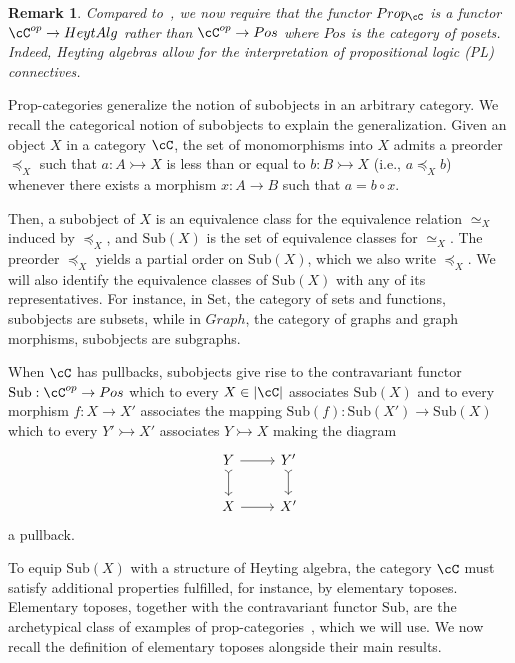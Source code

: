 \documentclass[preprint,3p,times]{elsarticle}
\newtheorem{remark}[definition]{Remark}
\newcommand{\Set}{\mathrm{Set}}
\newcommand{\Sub}{\mathrm{Sub}}
\newcommand{\Heytalg}{HeytAlg}
\newcommand{\mto}{\rightarrowtail}
\begin{document}
\begin{remark}
    Compared to~\cite{AB23}, we now require that the functor \(Prop_\cC\) is a functor \(\cC^{op} \to \Heytalg\) rather than \(\cC^{op} \to Pos\) where \(Pos\) is the category of posets. Indeed, Heyting algebras allow for the interpretation of propositional logic (PL) connectives. %
\end{remark}
 
Prop-categories generalize the notion of subobjects in an arbitrary category. We recall the categorical notion of subobjects to explain the generalization. 
Given an object \(X\) in a category \(\cC\), the set of monomorphisms into \(X\) admits a preorder \(\preceq_X\) such that \(a: A \mto X\) is less than or equal to \(b: B \mto X\) (i.e., $a \preceq_X b$) whenever there exists a morphism \(x: A \to B\) such that \(a = b \circ x\).

Then, a subobject of \(X\) is an equivalence class for the equivalence relation \(\simeq_X\) induced by \(\preceq_X\), and $\Sub(X)$ is the set of equivalence classes for $\simeq_X$. The preorder \(\preceq_X\) yields a partial order on \(\Sub(X)\), which we also write \(\preceq_X\). We will also identify the equivalence classes of \(\Sub(X)\) with any of its representatives. For instance, in \(\Set\), the category of sets and functions, subobjects are subsets, while in \(Graph\), the category of graphs and graph morphisms, subobjects are subgraphs.

When \(\cC\) has pullbacks, subobjects give rise to the contravariant functor $\Sub : \cC^{op} \to Pos$ which to every $X \in |\cC|$ associates $\Sub(X)$ and to every morphism $f : X \to X'$ associates the mapping $\Sub(f) : \Sub(X') \to \Sub(X)$ which to every $Y' \mto X'$ associates $Y \mto X$ making the diagram
\[\begin{tikzcd}
	Y & {Y'} \\
	X & {X'}
	\arrow[from=1-1, to=1-2]
	\arrow[tail, from=1-2, to=2-2]
	\arrow[tail, from=1-1, to=2-1]
	\arrow[from=2-1, to=2-2]
\end{tikzcd}\]
a pullback.

To equip $\Sub(X)$ with a structure of Heyting algebra, the category $\cC$ must satisfy additional properties fulfilled, for instance, by elementary toposes. Elementary toposes, together with the contravariant functor $\Sub$, are the archetypical class of examples of prop-categories~\cite{Johnstone02}, which we will use. We now recall the definition of elementary toposes alongside their main results.
\end{document}
